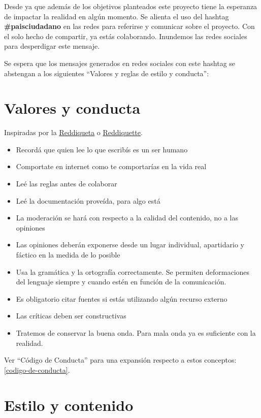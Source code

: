 \documentclass[
]{book}
\providecommand{\tightlist}{%
  \setlength{\itemsep}{0pt}\setlength{\parskip}{0pt}}
\begin{document}
Desde ya que además de los objetivos planteados este proyecto tiene la esperanza de impactar la realidad en algún momento. Se alienta el uso del hashtag \textbf{\#paisciudadano} en las redes para referirse y comunicar sobre el proyecto. Con el solo hecho de compartir, ya estás colaborando. Inundemos las redes sociales para desperdigar este mensaje.

Se espera que los mensajes generados en redes sociales con este hashtag se abstengan a los siguientes ``Valores y reglas de estilo y conducta'':

\hypertarget{valores-y-conducta}{%
\section{Valores y conducta}\label{valores-y-conducta}}

Inspiradas por la \href{https://www.reddit.com/wiki/es/reddiquette}{Reddiqueta} o \href{https://reddit.zendesk.com/hc/en-us/articles/205926439-Reddiquette}{Reddiquette}.

\begin{itemize}
\tightlist
\item
  Recordá que quien lee lo que escribís es un ser humano
\item
  Comportate en internet como te comportarías en la vida real
\item
  Leé las reglas antes de colaborar
\item
  Leé la documentación proveída, para algo está
\item
  La moderación se hará con respecto a la calidad del contenido, no a las opiniones
\item
  Las opiniones deberán exponerse desde un lugar individual, apartidario y fáctico en la medida de lo posible
\item
  Usa la gramática y la ortografía correctamente. Se permiten deformaciones del lenguaje siempre y cuando estén en función de la comunicación.
\item
  Es obligatorio citar fuentes si estás utilizando algún recurso externo
\item
  Las críticas deben ser constructivas
\item
  Tratemos de conservar la buena onda. Para mala onda ya es suficiente con la realidad.
\end{itemize}

Ver ``Código de Conducta'' para una expansión respecto a estos conceptos: \ref{codigo-de-conducta}.

\hypertarget{estilo-y-contenido}{%
\section{Estilo y contenido}\label{estilo-y-contenido}}
\end{document}
